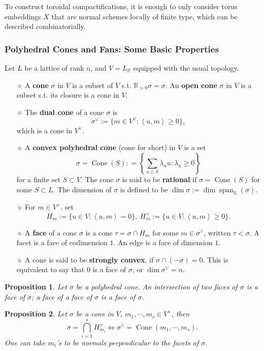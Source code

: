 \documentclass[11pt,english]{smfart}
\newtheorem{proposition}{Proposition}[section]
\theoremstyle{definition}
\theoremstyle{remark}
\newcommand{\R}{\mathbb{R}}
\DeclareMathOperator{\lspan}{span} %
\newcommand{\myit}{$\diamond$}
\newcommand{\dual}[1]{{#1}^\vee}
\DeclareMathOperator{\cone}{Cone}
\begin{document}
To construct toroidal compactifications, it is enough to only consider torus embeddings $X$ that are normal schemes locally of finite type,
which can be described combinatorially.

\subsubsection{Polyhedral Cones and Fans: Some Basic Properties}
Let $L$ be a lattice of rank $n$, and $V = L_{\R}$ equipped with the usual topology.
\begin{enumerate}
    \item [\myit] A \textbf{cone} $\sigma$ in $V$ is a subset of $V$ s.t. $\mathbb{R}_{ >0 }\sigma = \sigma$. An \textbf{open cone} $\sigma$ in $V$ is a subset s.t. its closure is a cone in $V$.
    \item [\myit] The \textbf{dual cone} of a cone $\sigma$ is \[\dual{\sigma} := \{m\in \dual{V}: \left<u, m\right>\ge 0\},\] which is a cone in $\dual{V}$.
    \item [\myit] A \textbf{convex polyhedral cone} (cone for short) in $V$ is a set \[\sigma = \cone(S) : =\left\{ \sum_{u\in S}\lambda_uu:\lambda_u \ge 0 \right\}\] for a finite set $S\subset V$.
    The cone $\sigma$ is said to be \textbf{rational} if $\sigma = \cone(S)$ for some $S\subset L$.
    The dimension of $\sigma$ is defined to be $\dim\sigma := \dim\lspan_{\R}(\sigma)$.
    \item [\myit] For $m\in \dual{V}$, set \[H_m := \{u\in V: \left< u,m\right> = 0\},\ H_m^+:=\{u\in V:\left< u, m\right>\ge 0\}.\]
    \item [\myit] A \textbf{face} of a cone $\sigma$ is a cone $\tau = \sigma\cap H_m$ for some $m\in\dual{\sigma}$, written $\tau < \sigma$. A facet is a face of codimension $1$. An edge is a face of dimension $1$.
    \item [\myit] A cone is said to be \textbf{strongly convex}, if $\sigma\cap(-\sigma) = 0$. This is equivalent to say that $0$ is a face of $\sigma$, or $\dim\sigma^{\vee} = n$.
\end{enumerate}
\begin{proposition}
    Let $\sigma$ be a polyhedral cone. An intersection of two faces of $\sigma$ is a face of $\sigma$; a face of a face of $\sigma$ is a face of $\sigma$.
\end{proposition}
\begin{proposition}
    Let $\sigma$ be a cone in $V$, $m_1, \cdots, m_s\in \dual{V}$, then \[\sigma = \bigcap_{i=1}^sH_{m_i}^+\iff \dual{\sigma} = \cone(m_1, \cdots, m_s).\]
    One can take $m_i$'s to be normals perpendicular to the facets of $\sigma$.
\end{proposition}
\end{document}
